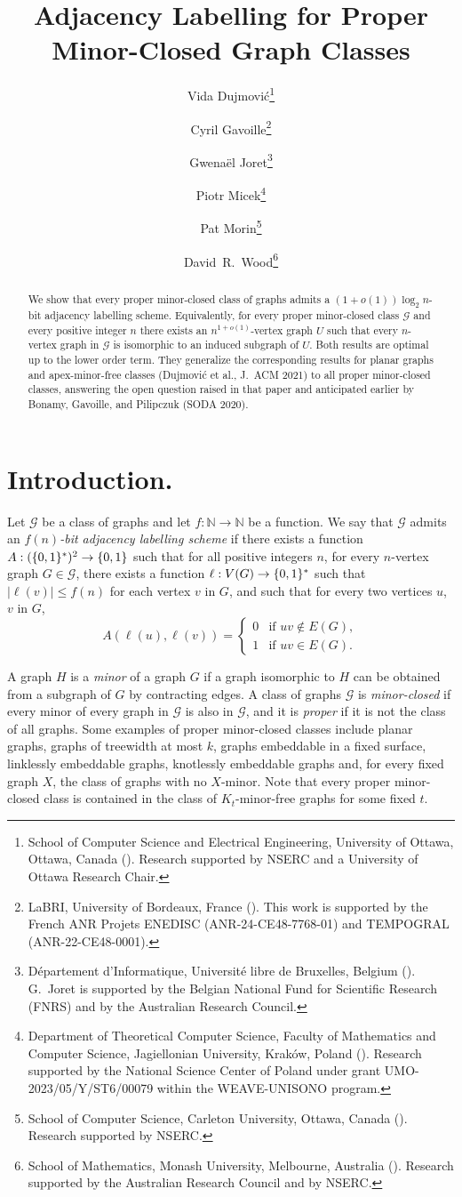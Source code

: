 \documentclass[twoside,leqno]{article}
\title{\Large Adjacency Labelling for Proper Minor-Closed Graph Classes}
\author{
Vida Dujmovi{\'c}\thanks{School of Computer Science and Electrical Engineering, University of Ottawa, Ottawa, Canada (\email{vida.dujmovic@uottawa.ca}). Research supported by NSERC and a University of Ottawa Research Chair.}
\and
Cyril Gavoille\thanks{LaBRI, University of Bordeaux, France (\email{gavoille@labri.fr}). This work is supported by the French ANR Projets ENEDISC (ANR-24-CE48-7768-01) and TEMPOGRAL (ANR-22-CE48-0001).}
\and
Gwena\"el Joret\thanks{D\'epartement d'Informatique, Universit\'e libre de Bruxelles, Belgium (\email{gwenael.joret@ulb.be}). G.\ Joret is supported by the Belgian National Fund for Scientific Research (FNRS) and by the Australian Research Council.}
\and
Piotr Micek\thanks{Department of Theoretical Computer Science, Faculty of Mathematics and Computer Science, Jagiellonian University, Kraków, Poland (\email{piotr.micek@uj.edu.pl}). Research supported by the National Science Center of Poland under grant UMO-2023/05/Y/ST6/00079 within the WEAVE-UNISONO program.}
\and
Pat Morin\thanks{School of Computer Science, Carleton University, Ottawa, Canada (\email{morin@scs.carleton.ca}). Research supported by NSERC.}
\and
David~R.~Wood\thanks{School of Mathematics, Monash University, Melbourne, Australia (\email{david.wood@monash.edu}). Research supported by the Australian Research Council and by NSERC.}
}
\date{}
\newcommand{\N}{\mathbb{N}}
\renewcommand{\leq}{\leqslant}
\newcommand{\defin}[1]{\emph{\textcolor{brightmaroon}{#1}}}
\newcommand{\calG}{\mathcal{G}}
\DeclarePairedDelimiter{\set}{\{}{\}}
\begin{document}
\maketitle


\begin{abstract}
  We show that every proper minor-closed class of graphs admits a $(1+o(1))\log_2 n$-bit adjacency labelling scheme. Equivalently, for every proper minor-closed class $\mathcal{G}$ and every positive integer $n$ there exists an $n^{1+o(1)}$-vertex graph $U$ such that every $n$-vertex graph in $\mathcal{G}$ is isomorphic to an induced subgraph of $U$.   Both results are optimal up to the lower order term. They generalize the corresponding results for planar graphs and apex-minor-free classes (Dujmovi\'c et al., J.~ACM 2021) to all proper minor-closed classes, answering the open question raised in that paper and anticipated earlier by Bonamy, Gavoille, and Pilipczuk (SODA 2020).



\end{abstract}


\bigskip
\section{Introduction.}
Let $\calG$ be a class of graphs and let $f:\N\to\N$ be a function.
We say that $\calG$ admits an \defin{$f(n)$-bit adjacency labelling scheme} if there exists a function $A:(\set{0,1}^*)^2\to\set{0,1}$ such that for all positive integers $n$, for every $n$-vertex graph $G\in\calG$, there exists a function $\ell: V(G)\to\set{0,1}^*$ such that
$|\ell(v)|\leq f(n)$ for each vertex $v$ in $G$, and such that
for every two vertices $u$, $v$ in $G$,
\[
  A(\ell(u),\ell(v))=\begin{cases}
    0 & \textrm{if $uv\notin E(G)$}, \\
    1 & \textrm{if $uv\in E(G)$}.
  \end{cases}
\]


A graph $H$ is a \defin{minor} of a graph $G$ if a graph isomorphic to $H$ can
be obtained from a subgraph of $G$ by contracting edges. A class of graphs
$\mathcal{G}$ is \defin{minor-closed} if every minor of every graph in
$\mathcal{G}$ is also in $\mathcal{G}$, and it is \defin{proper} if it is not the class of all graphs. Some examples of proper minor-closed classes include planar graphs, graphs of treewidth at most $k$, graphs embeddable in a fixed
surface, linklessly embeddable graphs, knotlessly embeddable graphs and, for every fixed graph $X$, the class of graphs with no $X$-minor. Note that every proper minor-closed class is contained in the class of $K_t$-minor-free graphs for some fixed $t$.
\end{document}
